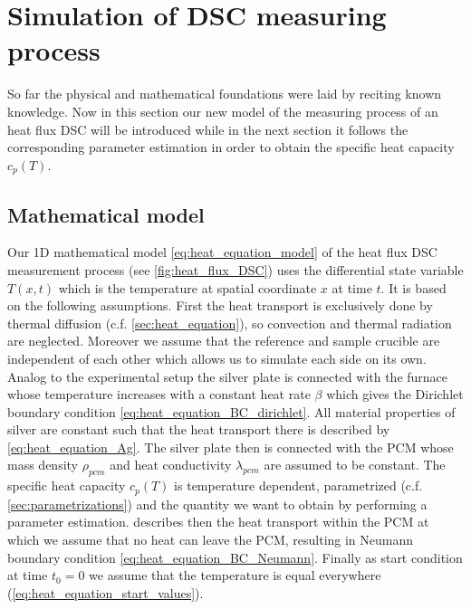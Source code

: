 \documentclass{scrartcl}[12pt, halfparskip]
\numberwithin{equation}{section}
\numberwithin{figure}{section}
\numberwithin{table}{section}
\begin{document}
\newpage
\section{Simulation of DSC measuring process}

So far the physical and mathematical foundations were laid by reciting known knowledge. Now in this section our new model of the measuring process of an heat flux DSC will be introduced while in the next section it follows the corresponding parameter estimation in order to obtain the specific heat capacity $c_p(T)$.



\subsection{Mathematical model}
\label{sec:mathematical_model}

Our 1D mathematical model \cref{eq:heat_equation_model} of the heat flux DSC measurement process (see \cref{fig:heat_flux_DSC}) uses the differential state variable $T(x,t)$ which is the temperature at spatial coordinate $x$ at time $t$. It is based on the following assumptions. First the heat transport is exclusively done by thermal diffusion (c.f. \cref{sec:heat_equation}), so convection and thermal radiation are neglected. 
Moreover we assume that the reference and sample crucible  are independent of each other which allows us to simulate each side on its own. 
Analog to the experimental setup the silver plate is connected with the furnace whose temperature increases with a constant heat rate $\beta$ which gives the Dirichlet boundary condition \cref{eq:heat_equation_BC_dirichlet}. All material properties of silver are constant such that the heat transport there is described by \cref{eq:heat_equation_Ag}. The silver plate then is connected with the PCM whose mass density $\rho_{pcm}$ and heat conductivity $\lambda_{pcm}$ are assumed to be constant. The specific heat capacity $c_p(T)$ is temperature dependent, parametrized (c.f. \cref{sec:parametrizations}) and the quantity we want to obtain by performing a parameter estimation.  describes then the heat transport within the PCM at which we assume that no heat can leave the PCM, resulting in Neumann boundary condition \cref{eq:heat_equation_BC_Neumann}. Finally as start condition at time ${t_0 = 0}$ we assume that the temperature is equal everywhere (\cref{eq:heat_equation_start_values}).
\end{document}
